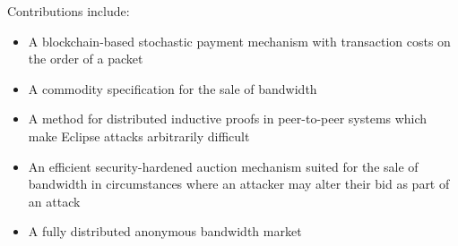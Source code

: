 \smallskip
\noindent
Contributions include:
\begin{itemize}
\item A blockchain-based stochastic payment mechanism with transaction costs on the order of a packet
\item A commodity specification for the sale of bandwidth
\item A method for distributed inductive proofs in peer-to-peer systems which make Eclipse attacks arbitrarily difficult
\item An efficient security-hardened auction mechanism suited for the sale of bandwidth in circumstances where an attacker may alter their bid as part of an attack
\item A fully distributed anonymous bandwidth market
\end{itemize}
